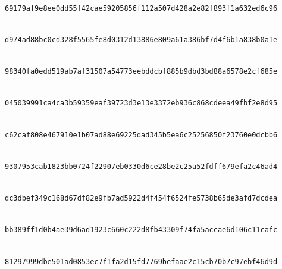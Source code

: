 \documentclass[pdflatex,sn-mathphys-num]{sn-jnl}%
\theoremstyle{thmstyleone}%
\theoremstyle{thmstyletwo}%
\theoremstyle{thmstylethree}%
\begin{document}
\begin{landscape}
\noindent{}\\
\texttt{69179af9\allowbreak{}e8ee0dd5\allowbreak{}5f42cae5\allowbreak{}9205856f\allowbreak{}112a507d\allowbreak{}428a2e82\allowbreak{}f893f1a6\allowbreak{}32ed6c96}\par
\noindent{}\\
\texttt{d974ad88\allowbreak{}bc0cd328\allowbreak{}f5565fe8\allowbreak{}d0312d13\allowbreak{}886e809a\allowbreak{}61a386bf\allowbreak{}7d4f6b1a\allowbreak{}838b0a1e}\par
\noindent{}\\
\texttt{98340fa0\allowbreak{}edd519ab\allowbreak{}7af31507\allowbreak{}a54773ee\allowbreak{}bddcbf88\allowbreak{}5b9dbd3b\allowbreak{}d88a6578\allowbreak{}e2cf685e}\par
\noindent{}\\
\texttt{04503999\allowbreak{}1ca4ca3b\allowbreak{}59359eaf\allowbreak{}39723d3e\allowbreak{}13e3372e\allowbreak{}b936c868\allowbreak{}cdeea49f\allowbreak{}bf2e8d95}\par
\noindent{}\\
\texttt{c62caf80\allowbreak{}8e467910\allowbreak{}e1b07ad8\allowbreak{}8e69225d\allowbreak{}ad345b5e\allowbreak{}a6c25256\allowbreak{}850f2376\allowbreak{}0e0dcbb6}\par
\noindent{}\\
\texttt{9307953c\allowbreak{}ab1823bb\allowbreak{}0724f229\allowbreak{}07eb0330\allowbreak{}d6ce28be\allowbreak{}2c25a52f\allowbreak{}dff679ef\allowbreak{}a2c46ad4}\par
\noindent{}\\
\texttt{dc3dbef3\allowbreak{}49c168d6\allowbreak{}7df82e9f\allowbreak{}b7ad5922\allowbreak{}d4f454f6\allowbreak{}524fe573\allowbreak{}8b65de3a\allowbreak{}fd7dcdea}\par
\noindent{}\\
\texttt{bb389ff1\allowbreak{}d0b4ae39\allowbreak{}d6ad1923\allowbreak{}c660c222\allowbreak{}d8fb4330\allowbreak{}9f74fa5a\allowbreak{}ccae6d10\allowbreak{}6c11cafc}\par
\noindent{}\\
\texttt{81297999\allowbreak{}dbe501ad\allowbreak{}0853ec7f\allowbreak{}1fa2d15f\allowbreak{}d7769bef\allowbreak{}aae2c15c\allowbreak{}b70b7c97\allowbreak{}ebf46d9d}\par

\end{landscape}
\end{document}
